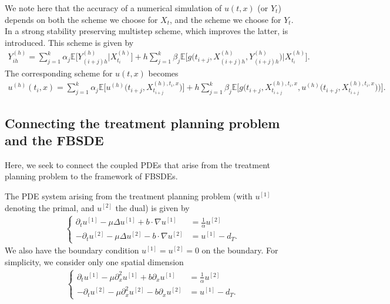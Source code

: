 \documentclass{article}  %
\begin{document}
We note here that the accuracy of a numerical simulation of $u(t,x)$ (or $Y_t$) depends on both the scheme we choose for $X_t$, and the scheme we choose for $Y_t$. In \cite{fang2023strong} a strong stability preserving multistep scheme, which improves the latter, is introduced. This scheme is given by
%
\begin{align} %
    Y_{ih}^{(h)} = \sum_{j=1}^{k} \alpha_j \mathbb{E}\bigg[ Y_{(i+j)h}^{(h)} \Big\lvert X_{t_i}^{(h)} \bigg] + h \sum_{j=1}^{k} \beta_j \mathbb{E}\bigg[ g\big(t_{i+j},X_{(i+j)h}^{(h)},Y_{(i+j)h}^{(h)}\big) \Big\lvert X_{t_i}^{(h)} \bigg].
\end{align}
%
The corresponding scheme for $u(t,x)$ becomes
%
\begin{align} 
    u^{(h)}(t_i,x) = \sum_{j=1}^{k} \alpha_j \mathbb{E}\bigg[ u^{(h)}\Big(t_{i+j},X_{t_{i+j}}^{(h),t_i,x}\Big) \bigg] + h \sum_{j=1}^{k} \beta_j \mathbb{E}\bigg[ g\Big(t_{i+j},X_{t_{i+j}}^{(h),t_i,x},u^{(h)}\big(t_{i+j},X_{t_{i+j}}^{(h),t_i,x}\big)\Big) \bigg].
\end{align}
%

\subsection{Connecting the treatment planning problem and the FBSDE}

Here, we seek to connect the coupled PDEs that arise from the treatment planning problem to the framework of FBSDEs.

The PDE system arising from the treatment planning problem (with $u^{[1]}$ denoting the primal, and $u^{[2]}$ the dual) is given by
%
\begin{align}
    \begin{cases}
    \partial_t u^{[1]} - \mu \Delta u^{[1]} + b \cdot \nabla u^{[1]} &= \frac{1}{\alpha} u^{[2]} \\
    - \partial_t u^{[2]} - \mu \Delta u^{[2]} - b \cdot \nabla u^{[2]} &= u^{[1]} - d_T.
    \end{cases}
\end{align}
%
We also have the boundary condition $u^{[1]}=u^{[2]}=0$ on the boundary. 
%
For simplicity, we consider only one spatial dimension
%
\begin{align}
    \begin{cases}
    \partial_t u^{[1]} - \mu \partial^2_x u^{[1]} + b \partial_x u^{[1]} &= \frac{1}{\alpha} u^{[2]} \\
    - \partial_t u^{[2]} - \mu \partial_x^2 u^{[2]} - b \partial_x u^{[2]} &= u^{[1]} - d_T.
    \end{cases}
\end{align}
%
\end{document}

